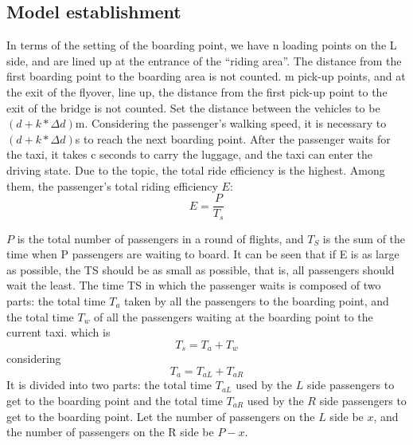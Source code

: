 \subsection{Model establishment}
In terms of the setting of the boarding point, we have n loading points on the L side, and are lined up at the entrance of the “riding area”. The distance from the first boarding point to the boarding area is not counted. m pick-up points, and at the exit of the flyover, line up, the distance from the first pick-up point to the exit of the bridge is not counted. Set the distance between the vehicles to be $(d+k*\Delta d)$m. Considering the passenger's walking speed, it is necessary to $(d+k*\Delta d)$s to reach the next boarding point. After the passenger waits for the taxi, it takes c seconds to carry the luggage, and the taxi can enter the driving state.
Due to the topic, the total ride efficiency is the highest.
Among them, the passenger's total riding efficiency $E$:
\begin{equation} E = \frac{P}{T_s}\end{equation}

$P$ is the total number of passengers in a round of flights, and $T_{S}$ is the sum of the time when P passengers are waiting to board.
It can be seen that if E is as large as possible, the TS should be as small as possible, that is, all passengers should wait the least.
The time TS in which the passenger waits is composed of two parts: the total time $T_{a}$ taken by all the passengers to the boarding point, and the total time $T_{w}$ of all the passengers waiting at the boarding point to the current taxi. which is
\begin{equation} T_{s} = T_a+T_w\end{equation}
considering
\begin{equation} T_{a} = T_{aL}+T_{aR}\end{equation}
It is divided into two parts: the total time $T_{aL}$ used by the $L$ side passengers to get to the boarding point and the total time $T_{aR}$ used by the $R$ side passengers to get to the boarding point. Let the number of passengers on the $L$ side be $x$, and the number of passengers on the R side be $P-x$.

